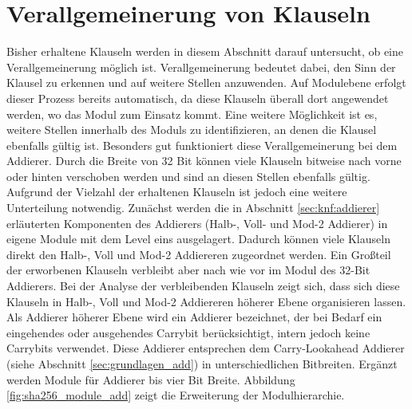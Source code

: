 \section{Verallgemeinerung von Klauseln}
\label{sec:ana:generalize}

Bisher erhaltene Klauseln werden in diesem Abschnitt darauf untersucht, ob eine Verallgemeinerung möglich ist. Verallgemeinerung bedeutet dabei, den Sinn der Klausel
zu erkennen und auf weitere Stellen anzuwenden. Auf Modulebene erfolgt dieser Prozess bereits automatisch, da diese Klauseln überall dort angewendet werden, wo das
Modul zum Einsatz kommt. Eine weitere Möglichkeit ist es, weitere Stellen innerhalb des Moduls zu identifizieren, an denen die Klausel ebenfalls gültig ist. Besonders
gut funktioniert diese Verallgemeinerung bei dem Addierer. Durch die Breite von 32 Bit können viele Klauseln bitweise nach vorne oder hinten verschoben werden und sind
an diesen Stellen ebenfalls gültig. Aufgrund der Vielzahl der erhaltenen Klauseln ist jedoch eine weitere Unterteilung notwendig. Zunächst werden die in Abschnitt
\ref{sec:knf:addierer} erläuterten Komponenten des Addierers (Halb-, Voll- und Mod-2 Addierer) in eigene Module mit dem Level eins ausgelagert. Dadurch können viele
Klauseln direkt den Halb-, Voll und Mod-2 Addiereren zugeordnet werden. Ein Großteil der erworbenen Klauseln verbleibt aber nach wie vor im Modul des 32-Bit Addierers.
Bei der Analyse der verbleibenden Klauseln zeigt sich, dass sich diese Klauseln in Halb-, Voll und Mod-2 Addiereren höherer Ebene organisieren lassen. Als Addierer
höherer Ebene wird ein Addierer bezeichnet, der bei Bedarf ein eingehendes oder ausgehendes Carrybit berücksichtigt, intern jedoch keine Carrybits verwendet. Diese
Addierer entsprechen dem Carry-Lookahead Addierer (siehe Abschnitt \ref{sec:grundlagen_add}) in unterschiedlichen Bitbreiten. Ergänzt werden Module für Addierer bis
vier Bit Breite. Abbildung \ref{fig:sha256_module_add} zeigt die Erweiterung der Modulhierarchie.
